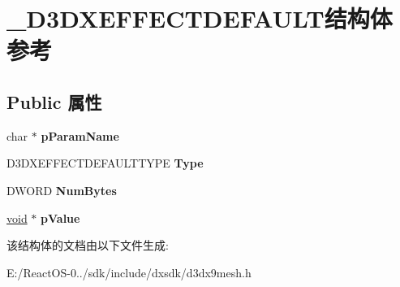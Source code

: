 \hypertarget{struct___d3_d_x_e_f_f_e_c_t_d_e_f_a_u_l_t}{}\section{\+\_\+\+D3\+D\+X\+E\+F\+F\+E\+C\+T\+D\+E\+F\+A\+U\+L\+T结构体 参考}
\label{struct___d3_d_x_e_f_f_e_c_t_d_e_f_a_u_l_t}
\subsection*{Public 属性}
\begin{DoxyCompactItemize}
\item 
\mbox{\label{struct___d3_d_x_e_f_f_e_c_t_d_e_f_a_u_l_t_af6e2bc289b72d507cad272e5739edde8}} 
char $\ast$ {\bfseries p\+Param\+Name}
\item 
\mbox{\label{struct___d3_d_x_e_f_f_e_c_t_d_e_f_a_u_l_t_a8a2bbb5e26ce555bde10713f0f715556}} 
D3\+D\+X\+E\+F\+F\+E\+C\+T\+D\+E\+F\+A\+U\+L\+T\+T\+Y\+PE {\bfseries Type}
\item 
\mbox{\label{struct___d3_d_x_e_f_f_e_c_t_d_e_f_a_u_l_t_a300bc9be5ab5517a887cfa29aed41d96}} 
D\+W\+O\+RD {\bfseries Num\+Bytes}
\item 
\mbox{\label{struct___d3_d_x_e_f_f_e_c_t_d_e_f_a_u_l_t_a0cf1a4b08a3c90092e912adf1b45c93e}} 
\hyperlink{interfacevoid}{void} $\ast$ {\bfseries p\+Value}
\end{DoxyCompactItemize}


该结构体的文档由以下文件生成\+:\begin{DoxyCompactItemize}
\item 
E\+:/\+React\+O\+S-\/0../sdk/include/dxsdk/d3dx9mesh.\+h\end{DoxyCompactItemize}
